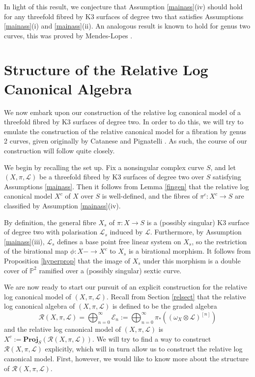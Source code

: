 \documentclass{amsart}
\begin{document}
In light of this result, we conjecture that Assumption \ref{mainass}(iv) should hold for any threefold fibred by K3 surfaces of degree two that satisfies Assumptions \ref{mainass}(i) and \ref{mainass}(ii). An analogous result is known to hold for genus two curves, this was proved by Mendes-Lopes \cite[Theorem 3.7]{ml}.

\section{Structure of the Relative Log Canonical Algebra} \label{relcanalg}

We now embark upon our construction of the relative log canonical model of a threefold fibred by K3 surfaces of degree two. In order to do this, we will try to emulate the construction of the relative canonical model for a fibration by genus 2 curves, given originally by Catanese and Pignatelli \cite{flgi}. As such, the course of our construction will follow \cite{flgi} quite closely.

We begin by recalling the set up. Fix a nonsingular complex curve $S$, and let $(X,\pi,{\mathcal{L}})$ be a threefold fibred by K3 surfaces of degree two over $S$ satisfying Assumptions \ref{mainass}. Then it follows from Lemma \ref{fingen} that the relative log canonical model $X^c$ of $X$ over $S$ is well-defined, and the fibres of $\pi^c\colon X^c \to S$ are classified by Assumption \ref{mainass}(iv).

By definition, the general fibre $X_s$ of $\pi\colon X \to S$ is a (possibly singular) K3 surface of degree two with polarisation ${\mathcal{L}}_s$ induced by ${\mathcal{L}}$. Furthermore, by Assumption \ref{mainass}(iii), ${\mathcal{L}}_s$ defines a base point free linear system on $X_s$, so the restriction of the birational map $\phi\colon X - \to X^c$ to $X_s$ is a birational morphism. It follows from Proposition \ref{hyperprop} that the image of $X_s$ under this morphism is a double cover of ${\mathbb{P}}^2$ ramified over a (possibly singular) sextic curve.

We are now ready to start our pursuit of an explicit construction for the relative log canonical model of $(X,\pi,{\mathcal{L}})$. Recall from Section \ref{relsect} that the relative log canonical algebra of $(X,\pi,{\mathcal{L}})$ is defined to be the graded algebra 
\[ {\mathcal{R}}(X,\pi,{\mathcal{L}}) = \bigoplus_{n=0}^{\infty} {\mathcal{E}}_n := \bigoplus_{n=0}^{\infty} \pi_*((\omega_X \otimes {\mathcal{L}})^{[n]}) \]
and the relative log canonical model of $(X,\pi,{\mathcal{L}})$ is $X^c:=\mathbf{Proj}_S ({\mathcal{R}}(X,\pi,{\mathcal{L}}))$. We will try to find a way to construct ${\mathcal{R}}(X,\pi,{\mathcal{L}})$ explicitly, which will in turn allow us to construct the relative log canonical model. First, however, we would like to know more about the structure of ${\mathcal{R}}(X,\pi,{\mathcal{L}})$. 
\end{document}
